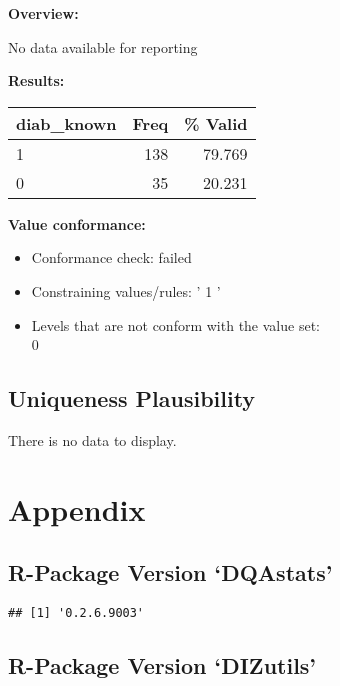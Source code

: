 \documentclass[
]{article}
\providecommand{\tightlist}{%
  \setlength{\itemsep}{0pt}\setlength{\parskip}{0pt}}
\begin{document}
\textbf{Overview:}

No data available for reporting

\textbf{Results:}\\

\begin{table}[H]
\centering
\begin{tabular}{l|r|r}
\hline
\textbf{diab\_known} & \textbf{Freq} & \textbf{\% Valid}\\
\hline
1 & 138 & 79.769\\
\hline
0 & 35 & 20.231\\
\hline
\end{tabular}
\end{table}

\textbf{Value conformance:}

\begin{itemize}
\tightlist
\item
  Conformance check: failed
\item
  Constraining values/rules: ' 1 '
\item
  Levels that are not conform with the value set:\\
  0
\end{itemize}

\hypertarget{uniqueness-plausibility}{%
\subsection{Uniqueness Plausibility}\label{uniqueness-plausibility}}

There is no data to display.

\newpage

\hypertarget{appendix}{%
\section{Appendix}\label{appendix}}

\hypertarget{r-package-version-dqastats}{%
\subsection{R-Package Version
`DQAstats'}\label{r-package-version-dqastats}}

\begin{verbatim}
## [1] '0.2.6.9003'
\end{verbatim}

\hypertarget{r-package-version-dizutils}{%
\subsection{R-Package Version
`DIZutils'}\label{r-package-version-dizutils}}
\end{document}
